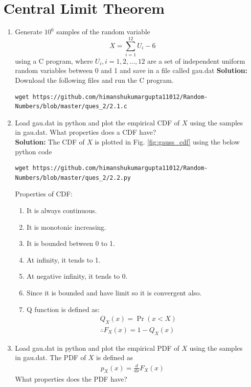\documentclass[journal,12pt,twocolumn]{IEEEtran}
\renewcommand\thesection{\arabic{section}}
\providecommand{\pr}[1]{\ensuremath{\Pr\left(#1\right)}}
\providecommand{\brak}[1]{\ensuremath{\left(#1\right)}}
\theoremstyle{remark}
\newcommand{\solution}{\noindent \textbf{Solution: }}
\numberwithin{equation}{section}
\begin{document}
\section{Central Limit Theorem}
%
\begin{enumerate}[label=\thesection.\arabic*
,ref=\thesection.\theenumi]
%
\item
Generate $10^6$ samples of the random variable
%
\begin{equation}
X = \sum_{i=1}^{12}U_i -6
\end{equation}
%
using a C program, where $U_i, i = 1,2,\dots, 12$ are  a set of independent uniform random variables between 0 and 1
and save in a file called gau.dat
%
\solution Download the following files and run the C program.
\begin{lstlisting}
wget https://github.com/himanshukumargupta11012/Random-Numbers/blob/master/ques_2/2.1.c
\end{lstlisting}
\item
Load gau.dat in python and plot the empirical CDF of $X$ using the samples in gau.dat. What properties does a CDF have?
\\
\solution The CDF of $X$ is plotted in Fig. \ref{fig:gauss_cdf}
using the below python code
\begin{lstlisting}
wget https://github.com/himanshukumargupta11012/Random-Numbers/blob/master/ques_2/2.2.py
\end{lstlisting}
Properties of CDF:
\begin{enumerate}
	\item It is always continuous.
	\item It is monotonic increasing.
	\item It is bounded between 0 to 1.
	\item At infinity, it tends to 1.
	\item At negative infinity, it tends to 0.
	\item Since it is bounded and have limit so it is convergent also.
	\item Q function is defined as:
	\begin{align}
		Q_X(x)=\pr{x<X}\\
	\therefore F_X\brak{x}=1-Q_X\brak{x}
	\end{align}
\end{enumerate}

\item
Load gau.dat in python and plot the empirical PDF of $X$ using the samples in gau.dat. The PDF of $X$ is defined as
\begin{align}
p_{X}(x) = \frac{d}{dx}F_{X}(x)
\end{align}
What properties does the PDF have?


\end{enumerate}
\end{document}

